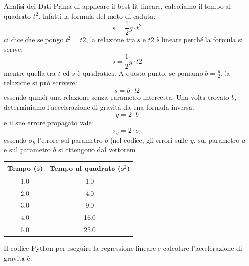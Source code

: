 \documentclass[12pt,a4paper,oneside]{book}
\makeatletter
\renewcommand{\subsection}{\@startsection {subsection}{2}{\z@}
{-3ex \@plus -0.1ex \@minus -.4ex}
{0.5ex \@plus.2ex }
{\color[rgb]{0.141,0.596,0.749}\normalfont\sffamily\bfseries}}
\theoremstyle{esercizio}
\makeatother
\begin{document}
\subsection{Analisi dei Dati}
Prima di applicare il best fit lineare, calcoliamo il tempo al quadrato \( t^2 \). Infatti la formula del moto di caduta:
\[
s=\frac{1}{2}g\cdot t^2
\]
ci dice che se pongo $t^2 =t2$, la relazione tra $s$ e  $t2$ è lineare perché la formula si scrive:
\[
s=\frac{1}{2} g \cdot t2
\]
mentre quella tra $t$ ed $s$ è quadratica. A questo punto, se poniamo  $b=\frac{g}{2}$, la relazione si può scrivere:
\[
s=b\cdot t2
\]
essendo quindi una relazione senza parametro intercetta. Una volta trovato $b$, determiniamo l'accelerazione di gravità da una formula inversa.
\[
g = 2\cdot b
\]
e il suo errore propagato vale:
\[\sigma_g = 2\cdot \sigma_b
\]
essendo $\sigma_b$ l'errore sul parametro $b$ (nel codice, gli errori sulle $y$, sul parametro $a$ e sul parametro $b$ si ottengono dal vettorem
\begin{center}
\begin{tabular}{|c|c|}
\hline
Tempo (s) & Tempo al quadrato (s\(^2\)) \\
\hline
1.0 & 1.0 \\
2.0 & 4.0 \\
3.0 & 9.0 \\
4.0 & 16.0 \\
5.0 & 25.0 \\
\hline
\end{tabular}
\end{center}

Il codice Python per eseguire la regressione lineare e calcolare l'accelerazione di gravità è:
\end{document}
